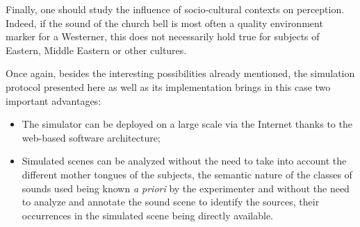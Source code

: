 \documentclass[12pt]{elsarticle}
\begin{document}

Finally, one should study the influence of socio-cultural contexts on perception. Indeed, if the sound of the church bell is most often a quality environment marker for a Westerner, this does not necessarily hold true for subjects of Eastern, Middle Eastern or other cultures.


Once again, besides the interesting possibilities already mentioned, the simulation protocol presented here as well as its implementation brings in this case two important advantages:


\begin{itemize}
\item The simulator can be deployed on a large scale via the Internet thanks to the web-based software architecture;
\item Simulated scenes can be analyzed without the need to take into account the different mother tongues of the subjects, the semantic nature of the classes of sounds used being known \emph{a priori} by the experimenter and without the need to analyze and annotate the sound scene to identify the sources, their occurrences in the simulated scene being directly available.
\end{itemize}

\end{document}
